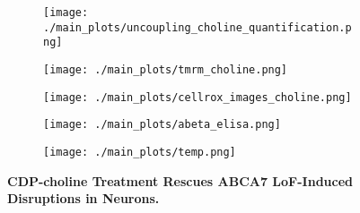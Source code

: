 \begin{figure}[H]
    \hspace{.4cm}
    \begin{subfigure}[t]{.17\textwidth}
        \caption{}
        \vspace{.4cm}
        \texttt{[image: ./main\_plots/uncoupling\_choline\_quantification.png]}        
    \end{subfigure}  
    \hspace{.4cm}  
    \begin{subfigure}[t]{.35\textwidth}
        \caption{}
        \vspace{-0.15cm}
        \texttt{[image: ./main\_plots/tmrm\_choline.png]}        
    \end{subfigure} 
   
    \begin{subfigure}[t]{.35\textwidth}
        \caption{}
        \texttt{[image: ./main\_plots/cellrox\_images\_choline.png]}        
    \end{subfigure}
    \hspace{.4cm}
    \begin{subfigure}[t]{.4\textwidth}
        \caption{}
        \texttt{[image: ./main\_plots/abeta\_elisa.png]}        
    \end{subfigure}  
    \hspace{.4cm}
    \begin{subfigure}[t]{.15\textwidth}
        \caption{}
        \texttt{[image: ./main\_plots/temp.png]}        
    \end{subfigure}  
    \caption{
        \textbf{CDP-choline Treatment Rescues ABCA7 LoF-Induced Disruptions in Neurons.}\\
    }
    \label{fig:main_choline}
\end{figure}
